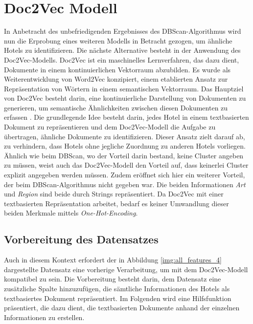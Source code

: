 \section{Doc2Vec Modell}
\label{subsubsec:doc2vec}
In Anbetracht des unbefriedigenden Ergebnisses des DBScan-Algorithmus wird nun die Erprobung eines weiteren Modells in Betracht gezogen, um ähnliche Hotels zu identifizieren. Die nächste Alternative besteht in der Anwendung des Doc2Vec-Modells.
\newline
\newline
Doc2Vec ist ein maschinelles Lernverfahren, das dazu dient, Dokumente in einem kontinuierlichen Vektorraum abzubilden. Es wurde als Weiterentwicklung von Word2Vec konzipiert, einem etablierten Ansatz zur Repräsentation von Wörtern in einem semantischen Vektorraum. Das Hauptziel von Doc2Vec besteht darin, eine kontinuierliche Darstellung von Dokumenten zu generieren, um semantische Ähnlichkeiten zwischen diesen Dokumenten zu erfassen \cite{LeV.16.05.2014}.
\newline
\newline
Die grundlegende Idee besteht darin, jedes Hotel in einem textbasierten Dokument zu repräsentieren und dem Doc2Vec-Modell die Aufgabe zu übertragen, ähnliche Dokumente zu identifizieren. Dieser Ansatz zielt darauf ab, zu verhindern, dass Hotels ohne jegliche Zuordnung zu anderen Hotels vorliegen.
\newline
\newline
Ähnlich wie beim DBScan, wo der Vorteil darin bestand, keine Cluster angeben zu müssen, weist auch das Doc2Vec-Modell den Vorteil auf, dass keinerlei Cluster explizit angegeben werden müssen. Zudem eröffnet sich hier ein weiterer Vorteil, der beim DBScan-Algorithmus nicht gegeben war. Die beiden Informationen \emph{Art} und \emph{Region} sind beide durch Strings repräsentiert. Da Doc2Vec mit einer textbasierten Repräsentation arbeitet, bedarf es keiner Umwandlung dieser beiden Merkmale mittels \emph{One-Hot-Encoding}.

\subsection{Vorbereitung des Datensatzes} 
Auch in diesem Kontext erfordert der in Abbildung \ref{img:all_features_4} dargestellte Datensatz eine vorherige Verarbeitung, um mit dem Doc2Vec-Modell kompatibel zu sein. Die Vorbereitung besteht darin, dem Datensatz eine zusätzliche Spalte hinzuzufügen, die sämtliche Informationen des Hotels als textbasiertes Dokument repräsentiert. 
\newline
\newline
Im Folgenden wird eine Hilfsfunktion präsentiert, die dazu dient, die textbasierten Dokumente anhand der einzelnen Informationen zu erstellen.

